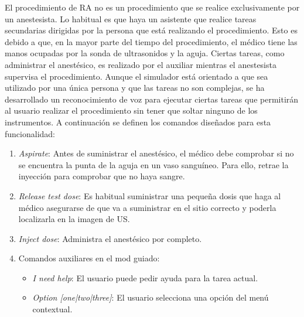El procedimiento de \ac{RA} no es un procedimiento que se realice exclusivamente por un anestesista. Lo habitual es que haya un asistente que  realice tareas secundarias dirigidas por la persona que está realizando el procedimiento. Esto es debido a que, en la mayor parte del tiempo del procedimiento, el médico tiene las manos ocupadas por la sonda de ultrasonidos y la aguja. Ciertas tareas, como administrar el anestésico, es realizado por el auxiliar mientras el anestesista supervisa el procedimiento. Aunque el simulador está orientado a que sea utilizado por una única persona y que las tareas no son complejas, se ha desarrollado un reconocimiento de voz para ejecutar ciertas tareas que permitirán al usuario realizar el procedimiento sin tener que soltar ninguno de los instrumentos. A continuación se definen los comandos diseñados para esta funcionalidad:

\begin{enumerate}
    \item \emph{Aspirate}: Antes de suministrar el anestésico, el médico debe comprobar si no se encuentra la punta de la aguja en un vaso sanguíneo. Para ello, retrae la inyección para comprobar que no haya sangre.
\item \emph{Release test dose}: Es habitual suministrar una pequeña dosis que haga al médico asegurarse de que va a suministrar en el sitio correcto y poderla localizarla en la imagen de \ac{US}.
\item \emph{Inject dose}: Administra el anestésico por completo.

\item Comandos auxiliares en el mod guiado:
\begin{itemize}
    \item \emph{I need help}: El usuario puede pedir ayuda para la tarea actual.
\item \emph{Option [one|two|three]}: El usuario selecciona una opción del menú contextual.

\end{itemize}

\end{enumerate}

 



